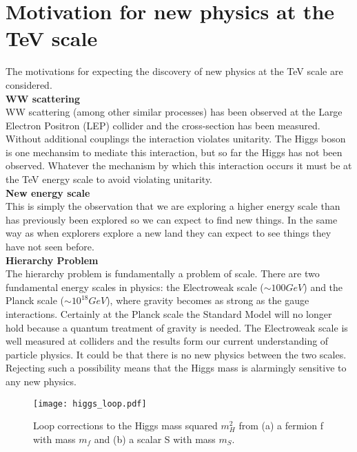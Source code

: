 \section{Motivation for new physics at the TeV scale}

The motivations for expecting the discovery of new physics at the TeV scale are
considered. \\

{\bf WW scattering} \\

WW scattering (among other similar processes) has been observed at the Large 
Electron Positron (LEP) collider and the cross-section has been measured. 
Without additional couplings the interaction violates unitarity. The Higgs boson 
is one mechansim to mediate this interaction, but so far the Higgs has not been 
observed. Whatever the mechanism by which this interaction occurs it must be at 
the TeV energy scale to avoid violating unitarity. \\

{\bf New energy scale} \\

This is simply the observation that we are exploring a higher energy scale than
has previously been explored so we can expect to find new things. In the same
way as when explorers explore a new land they can expect to see things they
have not seen before. \\

{\bf Hierarchy Problem} \\

The hierarchy problem is fundamentally a problem of scale. There are two
fundamental energy scales in physics: the Electroweak scale ($\sim100\unit{GeV}$) and
the Planck scale ($\sim10^{18}\unit{GeV}$), where gravity becomes as strong as the 
gauge interactions. Certainly at the Planck scale the Standard Model will no
longer hold because a quantum treatment of gravity is needed. The Electroweak 
scale is well measured at colliders and the results form our current 
understanding of particle physics. It could be that there is no new physics 
between the two scales. Rejecting such a possibility means that the Higgs mass 
is alarmingly sensitive to any new physics. \\

\begin{figure}
\begin{center}
\texttt{[image: higgs\_loop.pdf]}
\end{center}
\caption{Loop corrections to the Higgs mass squared $m_{H}^{2}$ from (a) a 
fermion f with mass $m_{f}$ and (b) a scalar S with mass $m_{S}$.}
\label{fig:higgs_loop}
\end{figure}

